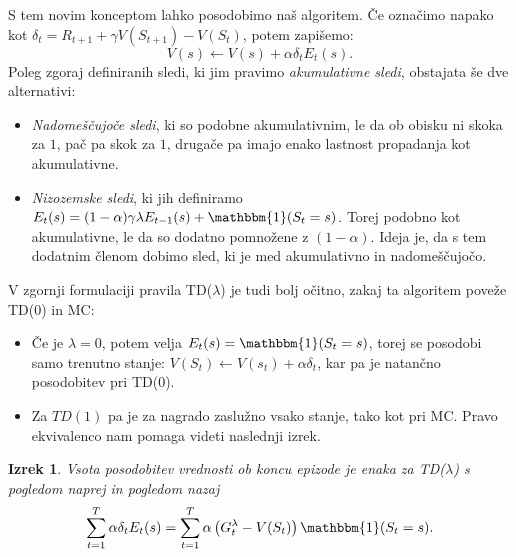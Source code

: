 \documentclass[12pt,a4paper]{amsart}
\theoremstyle{definition} %
\theoremstyle{plain} %
\newtheorem{izrek}[definicija]{Izrek}
\begin{document}
S tem novim konceptom lahko posodobimo naš algoritem. Če označimo napako kot $\delta_t = R_{t+1} + 
\gamma V(S_{t+1}) - V(S_t)$, potem zapišemo: 
\begin{equation}\label{TDlambda}
    V(s) \leftarrow V(s) + \alpha \delta_t E_t(s).
\end{equation}
Poleg zgoraj definiranih sledi, ki jim pravimo \textit{akumulativne sledi}, obstajata še dve 
alternativi:

\begin{itemize}
    \item \textit{Nadomeščujoče sledi}, ki so podobne akumulativnim, le da ob obisku ni skoka za 
            $1$, pač pa skok za $1$, drugače pa imajo enako lastnost propadanja kot akumulativne. 
    \item \textit{Nizozemske sledi}, ki jih definiramo $E_t(s) = (1 - \alpha) \gamma \lambda 
            E_{t-1}(s) + \mathbbm{1}(S_t = s)$. Torej podobno kot akumulativne, le da so dodatno 
            pomnožene z $(1 - \alpha)$. Ideja je, da s tem dodatnim členom dobimo sled, ki je med 
            akumulativno in nadomeščujočo.
\end{itemize}

V zgornji formulaciji pravila TD($\lambda$) je tudi bolj očitno, zakaj ta algoritem poveže TD($0$) 
in MC:

\begin{itemize}
    \item Če je $\lambda = 0$, potem velja $E_t(s) = \mathbbm{1}(S_t = s)$, torej se posodobi samo
            trenutno stanje: $V(S_t) \leftarrow V(s_t) + \alpha \delta_t$, kar pa je natančno 
            posodobitev pri TD($0$).
    \item Za $TD(1)$ pa je za nagrado zaslužno vsako stanje, tako kot pri MC. Pravo ekvivalenco 
            nam pomaga videti naslednji izrek.
\end{itemize}

\begin{izrek}
    Vsota posodobitev vrednosti ob koncu epizode je enaka za TD($\lambda$) s pogledom naprej in 
    pogledom nazaj
    $$
    \sum_{t=1}^T \alpha \delta_t E_t(s) = \sum_{t=1}^T \alpha \left( G_t^\lambda - V(S_t) \right) 
    \mathbbm{1}(S_t = s).
    $$
\end{izrek}
\end{document}
